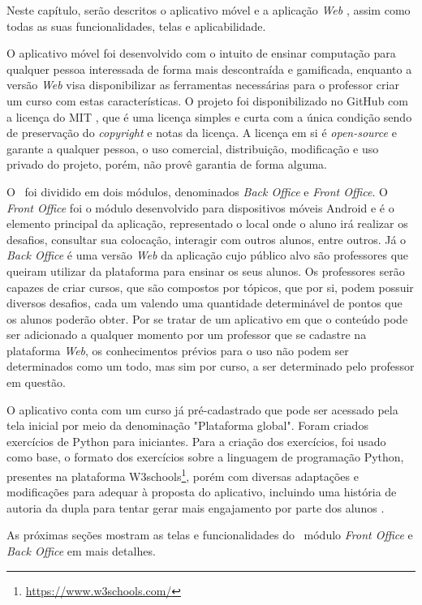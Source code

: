 Neste capítulo, serão descritos o aplicativo móvel e a aplicação \textit{Web} \appName, assim como todas as suas funcionalidades, telas e aplicabilidade.

O aplicativo móvel foi desenvolvido com o intuito de ensinar computação para qualquer pessoa interessada de forma mais descontraída e gamificada, enquanto a versão \textit{Web} visa disponibilizar as ferramentas necessárias para o professor criar um curso com estas características. O projeto foi disponibilizado no GitHub com a licença do MIT \cite{mit-license}, que é uma licença simples e curta com a única condição sendo de preservação do \textit{copyright} e notas da licença. A licença em si é \textit{open-source} e garante a qualquer pessoa, o uso comercial, distribuição, modificação e uso privado do projeto, porém, não provê garantia de forma alguma.

O \appName\ foi dividido em dois módulos, denominados \textit{Back Office} e \textit{Front Office}. O \textit{Front Office} foi o módulo desenvolvido para dispositivos móveis Android e é o elemento principal da aplicação, representado o local onde o aluno irá realizar os desafios, consultar sua colocação, interagir com outros alunos, entre outros. Já o \textit{Back Office} é uma versão \textit{Web} da aplicação cujo público alvo são professores que queiram utilizar da plataforma para ensinar os seus alunos. Os professores serão capazes de criar cursos, que são compostos por tópicos, que por si, podem possuir diversos desafios, cada um valendo uma quantidade determinável de pontos que os alunos poderão obter. Por se tratar de um aplicativo em que o conteúdo pode ser adicionado a qualquer momento por um professor que se cadastre na plataforma \textit{Web}, os conhecimentos prévios para o uso não podem ser determinados como um todo, mas sim por curso, a ser determinado pelo professor em questão.

O aplicativo conta com um curso já pré-cadastrado que pode ser acessado pela tela inicial por meio da denominação "Plataforma global". Foram criados exercícios de Python para iniciantes. Para a criação dos exercícios, foi usado como base, o formato dos exercícios sobre a linguagem de programação Python, presentes na plataforma W3schools\footnote{\url{https://www.w3schools.com/}}, porém com diversas adaptações e modificações para adequar à proposta do aplicativo, incluindo uma história de autoria da dupla para tentar gerar mais engajamento por parte dos alunos \cite{gamification_motivates}.

As próximas seções mostram as telas e funcionalidades do \appName\, módulo \textit{Front Office} e \textit{Back Office} em mais detalhes.

